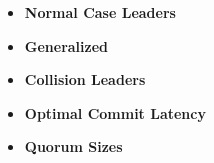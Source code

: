 \begin{itemize}
  \item \textbf{Normal Case Leaders}
  \item \textbf{Generalized}
  \item \textbf{Collision Leaders}
  \item \textbf{Optimal Commit Latency}
  \item \textbf{Quorum Sizes}
\end{itemize}
